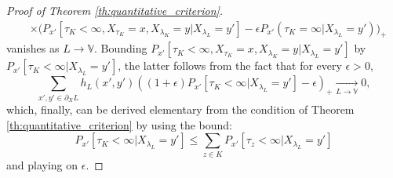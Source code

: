 \documentclass[10pt,a4paper]{amsart}
\begin{document}
\begin{proof}[Proof of Theorem \ref{th:quantitative_criterion}]
\begin{equation}
\begin{aligned}
    &\times \big(  P_{x'}[\tau_K<\infty, X_{\tau_K}=x, X_{\lambda_K}=y |X_{\lambda_L}=y']  -\epsilon P_{x'}(\tau_K=\infty|X_{\lambda_L}=y') \big)_+ 
  \end{aligned}
  \end{equation}
vanishes as $L \to \mathbb{V}$. Bounding $P_{x'}[\tau_K<\infty, X_{\tau_K}=x, X_{\lambda_K}=y  |X_{\lambda_L}=y']$ by $P_{x'}[\tau_K<\infty|X_{\lambda_L}=y']$, the latter follows from the fact that for every $\epsilon>0$,
\begin{equation}
    \sum_{x',y' \in \partial_X L} h_L(x', y') \left((1+\epsilon) P_{x'}[\tau_K<\infty | X_{\lambda_L}=y']-\epsilon \right)_+ \underset{L \to \mathbb{V}}{\longrightarrow} 0,
  \end{equation}
which, finally, can be derived elementary from the condition of Theorem \ref{th:quantitative_criterion} by using the bound:
\begin{equation}
  P_{x'}[\tau_K<\infty|X_{\lambda_L}=y'] \le \sum_{z\in K}  P_{x'}[\tau_z<\infty|X_{\lambda_L}=y']
\end{equation}
and playing on $\epsilon$.
\end{proof}
\end{document}
